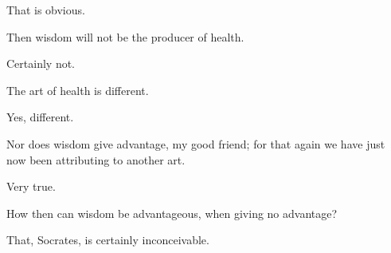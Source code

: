 \documentclass[11pt,letter]{article}
\begin{document}
\par  That is obvious.

\par  Then wisdom will not be the producer of health.

\par  Certainly not.

\par  The art of health is different.

\par  Yes, different.

\par  Nor does wisdom give advantage, my good friend; for that again we have just now been attributing to another art.

\par  Very true.

\par  How then can wisdom be advantageous, when giving no advantage?

\par  That, Socrates, is certainly inconceivable.
\end{document}
